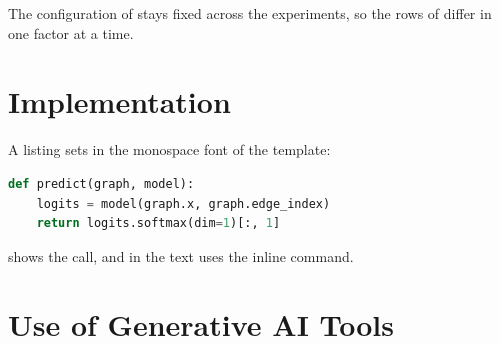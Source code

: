 The configuration of  stays fixed across the experiments, so the rows of  differ in one factor at a time.

\section{Implementation}
\label{sec:method-implementation}

A listing sets in the monospace font of the template:

\begin{lstlisting}[language=Python, caption={[A code listing]A code listing, numbered and referenced like a figure.}, label=lst:method-example]
def predict(graph, model):
    logits = model(graph.x, graph.edge_index)
    return logits.softmax(dim=1)[:, 1]
\end{lstlisting}

 shows the call, and  in the text uses the inline command.

\section{Use of Generative AI Tools}
\label{sec:method-ai-use}

